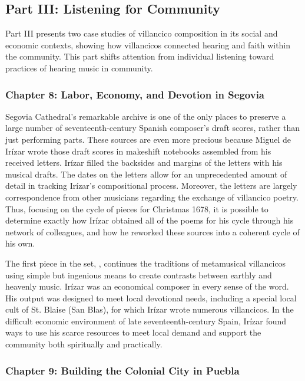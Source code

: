 \documentclass{vcbook-proposal}
\begin{document}
\subsection{Part III: Listening for Community}

Part III presents two case studies of villancico composition in its social and economic contexts, showing how villancicos connected hearing and faith within the community.
This part shifts attention from individual listening toward practices of hearing music in community.

\subsubsection{Chapter 8: Labor, Economy, and Devotion in Segovia}

Segovia Cathedral's remarkable archive is one of the only places to preserve a large number of seventeenth-century Spanish composer's draft scores, rather than just performing parts.
These sources are even more precious because Miguel de Irízar wrote those draft scores in makeshift notebooks assembled from his received letters.
Irízar filled the backsides and margins of the letters with his musical drafts.
The dates on the letters allow for an unprecedented amount of detail in tracking Irízar's compositional process.
Moreover, the letters are largely correspondence from other musicians regarding the exchange of villancico poetry.
Thus, focusing on the cycle of pieces for Christmas 1678, it is possible to determine exactly how Irízar obtained all of the poems for his cycle through his network of colleagues, and how he reworked these sources into a coherent cycle of his own.

The first piece in the set, , continues the traditions of metamusical villancicos using simple but ingenious means to create contrasts between earthly and heavenly music.
Irízar was an economical composer in every sense of the word.
His output was designed to meet local devotional needs, including a special local cult of St. Blaise (San Blas), for which Irízar wrote numerous villancicos. 
In the difficult economic environment of late seventeenth-century Spain, Irízar found ways to use his scarce resources to meet local demand and support the community both spiritually and practically.

\subsubsection{Chapter 9: Building the Colonial City in Puebla}
\end{document}
